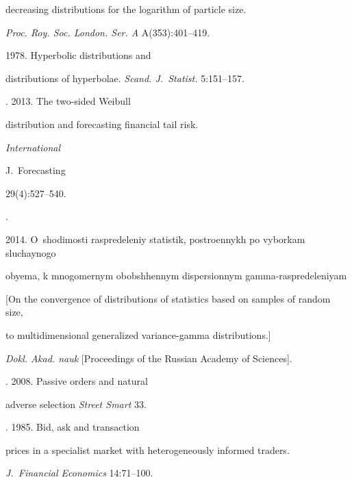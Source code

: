 decreasing distributions for the logarithm of particle size. 


{\it Proc. Roy. Soc. London. Ser. A} A(353):401--419.







 1978. Hyperbolic distributions and 


distributions of hyperbolae. {\it Scand. J.~Statist.} 5:151--157.







. 2013. The two-sided Weibull 


distribution and forecasting financial tail risk. {\it International 


J.~Forecasting} 29(4):527--540.







. 


2014. O~shodimosti raspredeleniy statistik, postroennykh po vyborkam sluchaynogo 


obyema, k mnogomernym obobshhennym dispersionnym gamma-raspredeleniyam 


[On the convergence of distributions of statistics based on samples of random size, 


to multidimensional generalized variance-gamma distributions.] 


{\it Dokl. Akad. nauk} [Proceedings of the Russian Academy of Sciences].







. 2008. Passive orders and natural 


adverse selection {\it Street Smart} 33.







. 1985. Bid, ask and transaction 


prices in a specialist market with heterogeneously informed traders. 


{\it J.~Financial Economics} 14:71--100.





